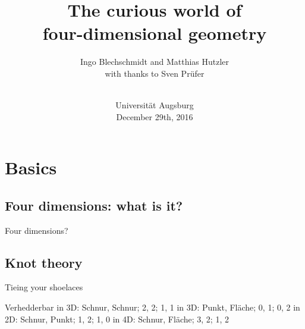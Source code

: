 \documentclass[12pt,compress,ngerman,utf8,t]{beamer}
\title[Four-dimensional geometry]{The curious world of \\ four-dimensional geometry}
\author[Ingo Blechschmidt, Matthias Hutzler]{\small Ingo Blechschmidt and Matthias Hutzler \\ with thanks to Sven Prüfer}
\date[2016-12-29]{\vspace*{-7em}\ \\\scriptsize Universität Augsburg \\ December 29th, 2016 \\ \phantom{foo}}
\renewcommand{\_}{\mathpunct{.}\,}
\begin{document}
\frame{\tableofcontents}


\section{Basics}

\subsection{Four dimensions: what is it?}

\begin{frame}{Four dimensions?}
\end{frame}


\subsection{Knot theory}

\begin{frame}{Tieing your shoelaces}
\end{frame}


Verhedderbar
in 3D: Schnur, Schnur; 2, 2; 1, 1
in 3D: Punkt, Fläche;  0, 1; 0, 2
in 2D: Schnur, Punkt;  1, 2; 1, 0
in 4D: Schnur, Fläche; 3, 2; 1, 2
\end{document}
